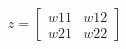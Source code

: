 \documentclass[preview]{standalone}
\begin{document}
\begin{align*}
z = \begin{bmatrix} w{11} & w{12} \\ w{21} & w{22} \end{bmatrix}
\end{align*}
\end{document}
